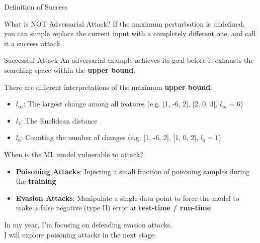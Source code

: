 \documentclass[9pt]{beamer}
\begin{document}
\begin{frame}{Definition of Success}
\begin{alertblock}{What is NOT Adversarial Attack?}
If the maximum perturbation is undefined, you can simple replace the current input with a completely different one, and call it a success attack. 
\end{alertblock}

\begin{block}{Successful Attack}
An adversarial example achieves its goal before it exhausts the searching space within the \textbf{upper bound}.
\end{block}

There are different interpretations of the maximum \textbf{upper bound}.

\begin{itemize}
    \item \textbf{$l_\infty$}: The largest change among all features (e.g. [1, -6, 2], [2, 0, 3], $l_\infty = 6$)
    \item \textbf{$l_2$}: The Euclidean distance 
    \item \textbf{$l_0$}: Counting the number of changes (e.g. [1, -6, 2], [1, 0, 2], $l_0 = 1$)
\end{itemize}
\end{frame}

\begin{frame}{When is the ML model vulnerable to attack?}
\begin{itemize}
    \item \textbf{Poisoning Attacks}: Injecting a small fraction of poisoning samples during the \textbf{training}
    \item \textbf{Evasion Attacks}: Manipulate a single data point to force the model to make a false negative (type II) error at \textbf{test-time / run-time}
\end{itemize}

In my  year, I'm focusing on defending evasion attacks. \\
I will explore poisoning attacks in the next stage.

\end{frame}
\end{document}
